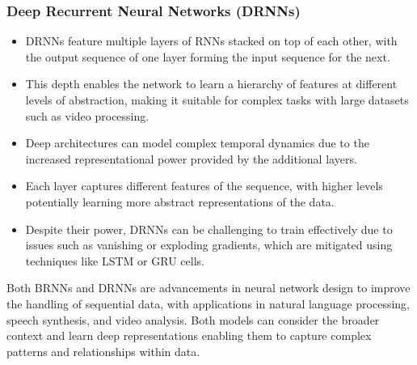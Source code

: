 \subsubsection*{Deep Recurrent Neural Networks (DRNNs)}
\begin{itemize}
    \item DRNNs feature multiple layers of RNNs stacked on top of each other, with the output sequence of one layer forming the input sequence for the next.
    \item This depth enables the network to learn a hierarchy of features at different levels of abstraction, making it suitable for complex tasks with large datasets such as video processing.
    \item Deep architectures can model complex temporal dynamics due to the increased representational power provided by the additional layers.
    \item Each layer captures different features of the sequence, with higher levels potentially learning more abstract representations of the data.
    \item Despite their power, DRNNs can be challenging to train effectively due to issues such as vanishing or exploding gradients, which are mitigated using techniques like LSTM or GRU cells.
\end{itemize}

Both BRNNs and DRNNs are advancements in neural network design to improve the handling of sequential data, with applications in natural language processing, speech synthesis, and video analysis. Both models can consider the broader context and learn deep representations enabling them to capture complex patterns and relationships within data.


